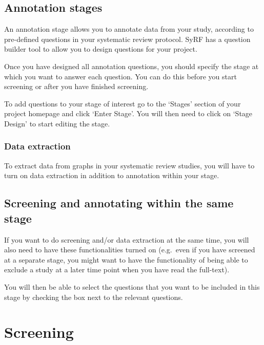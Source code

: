\documentclass[
]{book}
\begin{document}
\hypertarget{annotation-stages}{%
\section{Annotation stages}\label{annotation-stages}}

An annotation stage allows you to annotate data from your study, according to pre-defined questions in your systematic review protocol. SyRF has a question builder tool to allow you to design questions for your project.

Once you have designed all annotation questions, you should specify the stage at which you want to answer each question. You can do this before you start screening or after you have finished screening.

To add questions to your stage of interest go to the `Stages' section of your project homepage and click `Enter Stage'. You will then need to click on `Stage Design' to start editing the stage.

\hypertarget{data-extraction-1}{%
\subsection{Data extraction}\label{data-extraction-1}}

To extract data from graphs in your systematic review studies, you will have to turn on data extraction in addition to annotation within your stage.

\hypertarget{screening-and-annotating-within-the-same-stage}{%
\section{Screening and annotating within the same stage}\label{screening-and-annotating-within-the-same-stage}}

If you want to do screening and/or data extraction at the same time, you will also need to have these functionalities turned on (e.g.~even if you have screened at a separate stage, you might want to have the functionality of being able to exclude a study at a later time point when you have read the full-text).

You will then be able to select the questions that you want to be included in this stage by checking the box next to the relevant questions.

\hypertarget{screening}{%
\chapter{Screening}\label{screening}}
\end{document}
